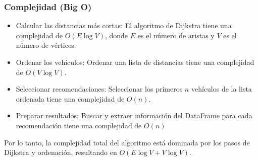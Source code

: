 \documentclass[12pt]{article}
\begin{document}
\subsubsection{Complejidad (Big O)}
\begin{itemize}
    \item Calcular las distancias más cortas: El algoritmo de Dijkstra tiene una complejidad de $O(E\log V)$, donde $E$ es el número de aristas y $V$ es el número de vértices.
    \item Ordenar los vehículos: Ordenar una lista de distancias tiene una complejidad de $O(V\log V)$.
    \item Seleccionar recomendaciones: Seleccionar los primeros $n$ vehículos de la lista ordenada tiene una complejidad de $O(n)$.
    \item Preparar resultados: Buscar y extraer información del DataFrame para cada recomendación tiene una complejidad de $O(n)$
\end{itemize}

Por lo tanto, la complejidad total del algoritmo está dominada por los pasos de Dijkstra y ordenación, resultando en $O(E\log V + V\log V)$.
\end{document}
